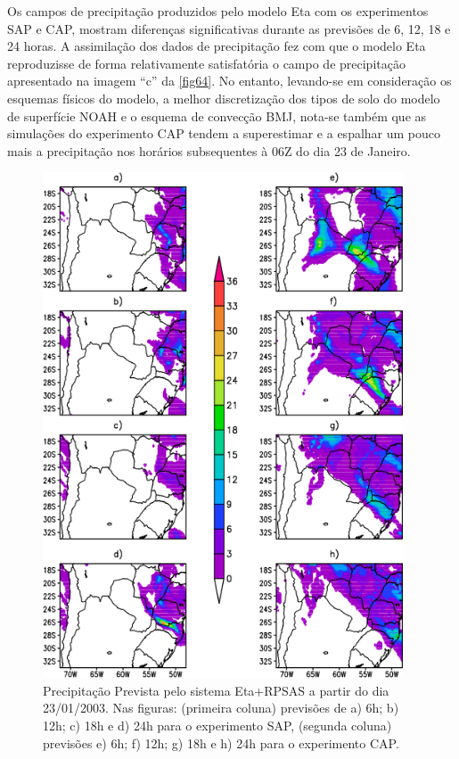 \break

Os campos de precipitação produzidos pelo modelo Eta com os experimentos SAP e CAP, mostram diferenças significativas durante as previsões de 6, 12, 18 e 24 horas. A assimilação dos dados de precipitação fez com que o modelo Eta reproduzisse de forma relativamente satisfatória o campo de precipitação apresentado na imagem ``c'' da \autoref{fig64}. No entanto, levando-se em consideração os esquemas físicos do modelo,  a melhor discretização dos tipos de solo do modelo de superfície NOAH e o esquema de convecção BMJ, nota-se também que as simulações do experimento CAP tendem a superestimar e a espalhar um pouco mais a precipitação nos horários subsequentes à 06Z do dia 23 de Janeiro.

\begin{figure}[!hpb]
\centering
\includegraphics[height=15cm]{./figs/prec_eta1.png}
\caption{Precipitação Prevista pelo sistema Eta+RPSAS a partir do dia 23/01/2003. Nas figuras: (primeira coluna) previsões de a) 6h; b) 12h; c) 18h e d) 24h para o experimento SAP, (segunda coluna) previsões e) 6h; f) 12h; g) 18h e h) 24h para o experimento CAP.}
\label{fig64}
\end{figure}

